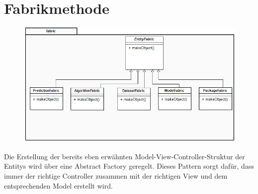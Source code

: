 \section{Fabrikmethode}

\begin{figure}[h]
\centering
\includegraphics[width=0.6\linewidth]{Grafik/Klassendiagramme/fabrik.png}
\end{figure}


Die Erstellung der bereits eben erwähnten Model-View-Controller-Struktur der Entitys wird über eine Abstract Factory geregelt. Dieses Pattern sorgt dafür, dass immer der richtige Controller zusammen mit der richtigen View und dem entsprechenden Model erstellt wird.

